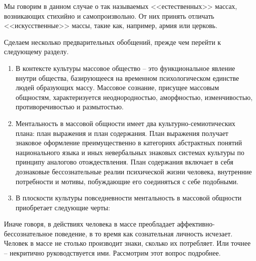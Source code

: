 Мы говорим в данном случае о так называемых <<естественных>> массах, возникающих стихийно и самопроизвольно.
От них принять отличать <<искусственные>> массы, такие как, например, армия или церковь.\autocite{freid_mass}

Сделаем несколько предварительных обобщений, прежде чем перейти к следующему разделу.
\begin{enumerate}
    \item В контексте культуры массовое общество – это функциональное явление внутри общества,
    базирующееся на временном психологическом единстве людей образующих массу. Массовое сознание,
    присущее массовым общностям, характеризуется неоднородностью, аморфностью, изменчивостью,
    противоречивостью и размытостью.
    \item Ментальность в массовой общности имеет два культурно-семиотических плана: план выражения и план содержания.
    План выражения получает знаковое оформление преимущественно в категориях абстрактных понятий
    национального языка и иных невербальных знаковых системах культуры по принципу аналогово отождествления.
    План содержания включает в себя дознаковые бессознательные реалии психической жизни человека, внутренние
    потребности и мотивы, побуждающие его соединяться с себе подобными.
    \item В плоскости культуры повседневности ментальность в массовой общности приобретает следующие черты:
\end{enumerate}

Иначе говоря, в действиях человека в массе преобладает аффективно-бессознательное поведение,
в то время как сознательная личность исчезает. Человек в массе не столько производит знаки, сколько их потребляет.  Или точнее -- некритично руководствуется ими. Рассмотрим этот вопрос подробнее.
